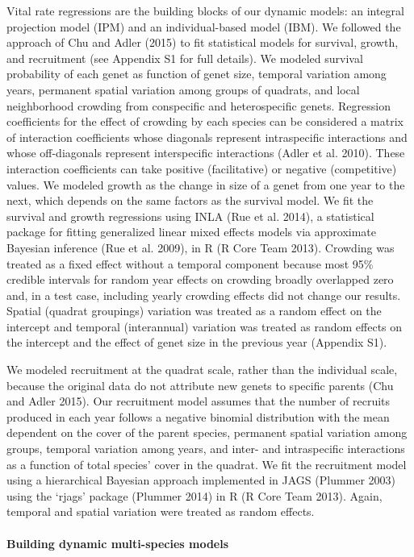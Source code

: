 \documentclass[12pt,]{article}
\begin{document}
Vital rate regressions are the building blocks of our dynamic models: an
integral projection model (IPM) and an individual-based model (IBM). We
followed the approach of Chu and Adler (2015) to fit statistical models
for survival, growth, and recruitment (see Appendix S1 for full
details). We modeled survival probability of each genet as function of
genet size, temporal variation among years, permanent spatial variation
among groups of quadrats, and local neighborhood crowding from
conspecific and heterospecific genets. Regression coefficients for the
effect of crowding by each species can be considered a matrix of
interaction coefficients whose diagonals represent intraspecific
interactions and whose off-diagonals represent interspecific
interactions (Adler et al. 2010). These interaction coefficients can
take positive (facilitative) or negative (competitive) values. We
modeled growth as the change in size of a genet from one year to the
next, which depends on the same factors as the survival model. We fit
the survival and growth regressions using INLA (Rue et al. 2014), a
statistical package for fitting generalized linear mixed effects models
via approximate Bayesian inference (Rue et al. 2009), in R (R Core Team
2013). Crowding was treated as a fixed effect without a temporal
component because most 95\% credible intervals for random year effects
on crowding broadly overlapped zero and, in a test case, including
yearly crowding effects did not change our results. Spatial (quadrat
groupings) variation was treated as a random effect on the intercept and
temporal (interannual) variation was treated as random effects on the
intercept and the effect of genet size in the previous year (Appendix
S1).

We modeled recruitment at the quadrat scale, rather than the individual
scale, because the original data do not attribute new genets to specific
parents (Chu and Adler 2015). Our recruitment model assumes that the
number of recruits produced in each year follows a negative binomial
distribution with the mean dependent on the cover of the parent species,
permanent spatial variation among groups, temporal variation among
years, and inter- and intraspecific interactions as a function of total
species' cover in the quadrat. We fit the recruitment model using a
hierarchical Bayesian approach implemented in JAGS (Plummer 2003) using
the `rjags' package (Plummer 2014) in R (R Core Team 2013). Again,
temporal and spatial variation were treated as random effects.

\paragraph{Building dynamic multi-species
models}\label{building-dynamic-multi-species-models}
\end{document}
